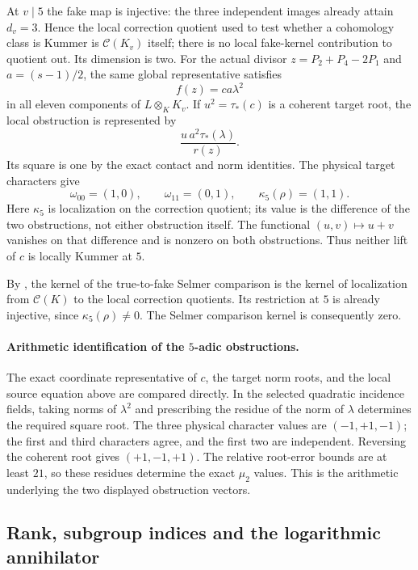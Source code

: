 At $v\mid5$ the fake map is injective: the three independent images
already attain $d_v=3$.  Hence the local correction quotient used to
test whether a cohomology class is Kummer is $\mathcal C(K_v)$ itself;
there is no local fake-kernel contribution to quotient out.  Its
dimension is two.  For the actual divisor $z=P_2+P_4-2P_1$ and
$a=(s-1)/2$, the same global representative satisfies
\[
                             f(z)=ca\lambda^2
\]
in all eleven components of $L\otimes_K K_v$.
If $u^2=\tau_*(c)$ is a coherent target root, the local obstruction
is represented by
\[
                         \frac{u\,a^2\tau_*(\lambda)}{r(z)}.
\]
Its square is one by the exact contact and norm identities.  The
physical target characters give
\[
 \omega_{00}=(1,0),\qquad \omega_{11}=(0,1),\qquad
                         \kappa_5(\rho)=(1,1).
\]
Here $\kappa_5$ is localization on the correction quotient; its value
is the difference of the two obstructions, not either obstruction
itself.  The functional $(u,v)\mapsto u+v$ vanishes on that difference
and is nonzero on both obstructions.  Thus neither lift of $c$ is
locally Kummer at $5$.

By \cite[Theorem~10.14 and Lemma~A.26]{BPS}, the kernel of the
true-to-fake Selmer comparison is the kernel of localization from
$\mathcal C(K)$ to the local correction quotients.  Its restriction
at $5$ is already injective, since $\kappa_5(\rho)\ne0$.
The Selmer comparison kernel is consequently zero.

\paragraph{Arithmetic identification of the $5$-adic obstructions.}
The exact coordinate representative of $c$, the target norm roots,
and the local source equation above are compared directly.  In the
selected quadratic incidence fields, taking norms of $\lambda^2$
and prescribing the residue of the norm of $\lambda$ determines the
required square root.  The three physical character values are
$(-1,+1,-1)$; the first and third characters agree, and the first two
are independent.  Reversing the coherent root gives $(+1,-1,+1)$.
The relative root-error bounds are at least $21$, so these residues
determine the exact $\mu_2$ values.  This is the arithmetic underlying
the two displayed obstruction vectors.

\subsection{Rank, subgroup indices and the logarithmic annihilator}

